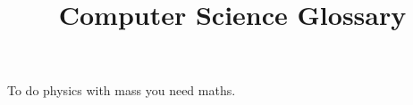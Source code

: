 \documentclass{article}
\title{Computer Science Glossary}
\author{ }
\date{ }
\begin{document}
\maketitle
 
To do physics with \Gls{mass} you need \gls{maths}. 
 
\clearpage
 
\printglossaries
 
\end{document}
